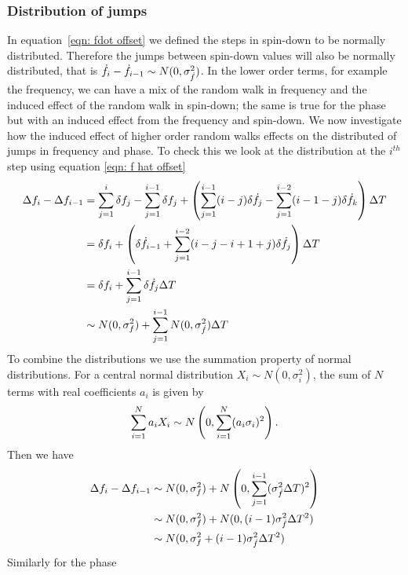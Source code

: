 \subsubsection{Distribution of jumps}
In equation~\eqref{eqn: fdot offset}  we defined the steps in spin-down to be
normally distributed. Therefore the jumps between spin-down values will also be
normally distributed, that is $\dot{f}_{i} - \dot{f}_{i-1} \sim N(0, \sigma_{\dot{f}}^{2})$. In
the lower order terms, for example the frequency, we can have a mix of the
random walk in frequency and the induced effect of the random walk in spin-down;
the same is true for the phase but with an induced effect from the frequency
and spin-down.  We now investigate how the induced effect of higher order random
walks effects on the distributed of jumps in frequency and phase. To check this
we  look at the distribution at the $i^{th}$ step using equation 
\eqref{eqn: f hat offset}
\begin{align}
\Delta f_{i} - \Delta f_{i-1} & = \sum_{j=1}^{i}\delta f_{j}
-  \sum_{j=1}^{i-1}\delta f_{j} + \left(\sum_{j=1}^{i-1}(i-j)\delta \dot{f}_{j}  
-  \sum_{j=1}^{i-2}(i-1-j)\delta \dot{f}_{k} \right)\Delta T  \\
& = \delta f_{i} + \left(\delta \dot{f}_{i-1} 
+ \sum_{j=1}^{i-2}(i-j-i+1+j)\delta \dot{f}_{j}\right)\Delta T \\
& = \delta f_{i} + \sum_{j=1}^{i-1}\delta \dot{f}_{j} \Delta T \\
& \sim N(0, \sigma_{f}^{2}) + \sum_{j=1}^{i-1}N(0, \sigma_{\dot{f}}^{2}) \Delta T 
\end{align}
To combine the distributions we use the summation property of normal
distributions. For a central normal distribution $X_{i}\sim N(0,
\sigma_{i}^{2})$, the sum of $N$ terms with real coefficients $a_{i}$ is given
by 
\begin{equation}
\sum_{i=1}^{N}a_{i}X_{i} \sim N\left(0, \sum_{i=1}^{N}(a_{i}\sigma_{i})^{2}\right).
\end{equation}
Then we have
\begin{align}
\Delta f_{i} - \Delta f_{i-1} & \sim N(0, \sigma_{f}^{2}) 
+ N\left(0, \sum_{j=1}^{i-1}(\sigma_{\dot{f}}^{2}\Delta T)^{2}\right) \\
& \sim N(0, \sigma_{f}^{2}) + N(0, (i-1)\sigma_{\dot{f}}^{2}\Delta T^{2}) \\
& \sim N(0, \sigma_{f}^{2} + (i-1)\sigma_{\dot{f}}^{2}\Delta T^2)  
\end{align}
Similarly for the phase 
